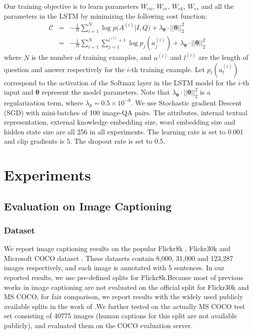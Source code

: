 \documentclass[10pt,journal,compsoc]{IEEEtran}
\def\ModParms{{\boldsymbol \theta}}
\begin{document}
Our training objective is to learn parameters $W_{ea}$, $W_{ec}$, $W_{ek}$, $W_{es}$ and all the parameters in the LSTM by minimizing the following cost function:
\begin{eqnarray}
    \mathcal{C}&=&-\frac{1}{N}\sum_{i=1}^N\log p(A^{(i)}|I,Q)+\lambda_\ModParms\cdot||\ModParms||_2^2 \\
    &=&-\frac{1}{N}\sum_{i=1}^N\sum_{j=1}^{l^{(i)}+1}\log p_j(a_j^{(i)})+\lambda_\ModParms\cdot||\ModParms||_2^2
\end{eqnarray}
where $N$ is the number of training examples, and $n^{(i)}$ and $l^{(i)}$ are the length of question and answer respectively for the $i$-th training example. Let $p_t(a_t^{(i)})$ correspond to the activation of the Softmax layer in the LSTM model for the $i$-th input and $\ModParms$ represent the model parameters. Note that $\lambda_\ModParms\cdot||\ModParms||_2^2$ is a regularization term, where $\lambda_\theta=0.5\times10^{-8}$. We use Stochastic gradient Descent (SGD) with mini-batches of 100 image-QA pairs. The attributes, internal textual representation, external knowledge embedding size, word embedding size and hidden state size are all 256 in all experiments. The learning rate is set to 0.001 and clip gradients is 5. The dropout rate is set to 0.5.
 
\section{Experiments}
\label{sec:exp}


\subsection{Evaluation on Image Captioning}
\subsubsection{Dataset}
We report image captioning results on the popular Flickr8k \cite{hodosh2013framing}, Flickr30k \cite{young2014image} and Microsoft COCO dataset \cite{lin2014microsoft}. These datasets contain 8,000, 31,000 and 123,287 images respectively, and each image is annotated with 5 sentences. In our reported results, we use pre-defined splits for Flickr8k.Because most of previous works in image captioning \cite{donahue2014long,fang2014captions,Karpathy2014deepvs,mao2014deep,vinyals2014show,xu2015show} are not evaluated on the official split for Flickr30k and MS COCO, for fair comparison, we report results with the widely used publicly available splits in the work of \cite{Karpathy2014deepvs}.We further tested on the actually MS COCO test set consisting of 40775 images (human captions for this split are not available publicly), and evaluated them on the COCO evaluation server.
\end{document}
